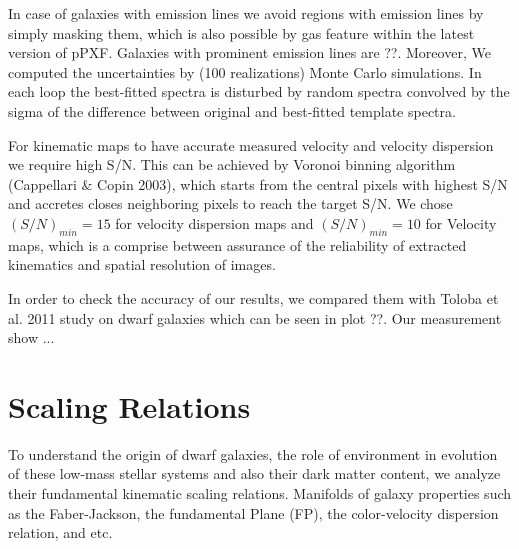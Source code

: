 \documentclass{aa}
\begin{document}
In case of galaxies with emission lines we avoid regions with emission lines by simply masking them, which is also possible by gas feature within the latest version of pPXF. Galaxies with prominent emission lines are ??. Moreover, We computed the uncertainties by (100 realizations) Monte Carlo simulations. In each loop the best-fitted spectra is disturbed by random spectra convolved by the sigma of the difference between original and best-fitted template spectra.  

For kinematic maps to have accurate measured velocity and velocity dispersion we require high S/N. This can be achieved by Voronoi binning algorithm (Cappellari \& Copin 2003), which starts from the central pixels with highest S/N and accretes closes neighboring pixels to reach the target S/N. We chose $(S/N)_{min}=15$ for velocity dispersion maps and $(S/N)_{min}=10$ for Velocity maps, which is a comprise between assurance of the reliability of extracted kinematics and spatial resolution of images.

In order to check the accuracy of our results, we compared them with Toloba et al. 2011 study on dwarf galaxies which can be seen in plot ??. Our measurement show ...

\section{Scaling Relations}
To understand the origin of dwarf galaxies, the role of environment in evolution of these low-mass stellar systems and also their dark matter content, we analyze their fundamental kinematic scaling relations. Manifolds of galaxy properties such as the Faber-Jackson, the fundamental Plane (FP), the color-velocity dispersion relation, and etc. 
\end{document}
